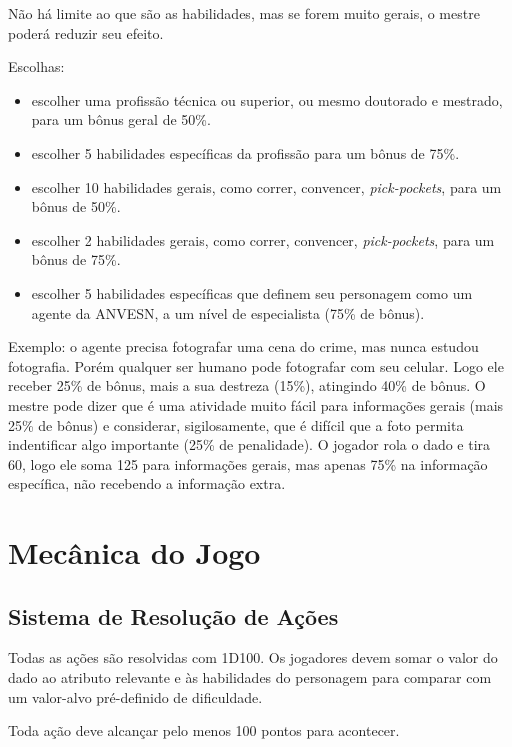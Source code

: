 \documentclass[a4paper,12pt]{book}
\begin{document}
Não há limite ao que são as habilidades, mas se forem muito gerais, o mestre poderá reduzir seu efeito.


Escolhas:
\begin{itemize}
\item escolher uma profissão técnica ou superior, ou mesmo doutorado e mestrado, para um bônus geral de 50\%.
\item escolher 5 habilidades específicas da profissão para um bônus de 75\%.
\item escolher 10  habilidades gerais, como correr, convencer, \textit{pick-pockets}, para um bônus de 50\%.
\item escolher 2  habilidades gerais, como correr, convencer, \textit{pick-pockets}, para um bônus de 75\%.
\item escolher 5 habilidades específicas que definem seu personagem como um agente da ANVESN, a um nível de especialista (75\% de bônus).
\end{itemize}


Exemplo: o agente precisa fotografar uma cena do crime, mas nunca estudou fotografia. Porém qualquer ser humano pode fotografar com seu celular. Logo ele receber 25\% de bônus, mais a sua destreza (15\%), atingindo 40\% de bônus. O mestre pode dizer que é uma atividade muito fácil para informações gerais (mais 25\% de bônus) e considerar, sigilosamente, que é difícil que a foto permita indentificar algo importante (25\% de penalidade). O jogador rola o dado e tira 60, logo ele soma 125 para informações gerais, mas apenas 75\% na informação específica, não recebendo a informação extra.


\chapter{Mecânica do Jogo}

\section{Sistema de Resolução de Ações}

Todas as ações são resolvidas com 1D100. Os jogadores devem somar o valor do dado ao atributo relevante e às habilidades do personagem para comparar com um valor-alvo pré-definido de dificuldade.

Toda ação deve alcançar pelo menos 100 pontos para acontecer.
\end{document}
